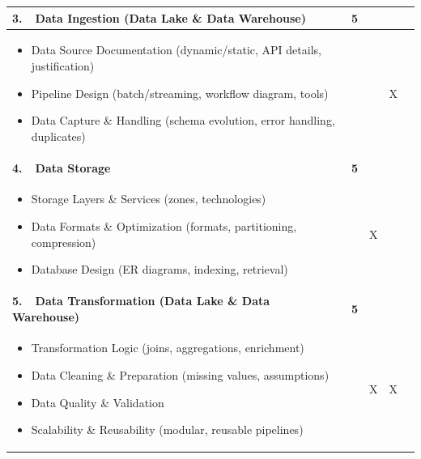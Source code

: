 \begin{table}[htbp]
\begin{tabular}{|L|P|C|C|C|}
\textbf{3.\ \ Data Ingestion (Data Lake \& Data Warehouse)} & \textbf{5} &  &  &  \\
\hline
\begin{minipage}[t]{\linewidth}\vspace{2pt}
\begin{itemize}[leftmargin=1.2em, nosep]
  \item Data Source Documentation (dynamic/static, API details, justification)
  \item Pipeline Design (batch/streaming, workflow diagram, tools)
  \item Data Capture \& Handling (schema evolution, error handling, duplicates)
\end{itemize}\vspace{2pt}
\end{minipage}
&  &  & X &  \\
\hline

\textbf{4.\ \ Data Storage} & \textbf{5} &  &  &  \\
\hline
\begin{minipage}[t]{\linewidth}\vspace{2pt}
\begin{itemize}[leftmargin=1.2em, nosep]
  \item Storage Layers \& Services (zones, technologies)
  \item Data Formats \& Optimization (formats, partitioning, compression)
  \item Database Design (ER diagrams, indexing, retrieval)
\end{itemize}\vspace{2pt}
\end{minipage}
&  & X &  &  \\
\hline

\textbf{5.\ \ Data Transformation (Data Lake \& Data Warehouse)} & \textbf{5} &  &  &  \\
\hline
\begin{minipage}[t]{\linewidth}\vspace{2pt}
\begin{itemize}[leftmargin=1.2em, nosep]
  \item Transformation Logic (joins, aggregations, enrichment)
  \item Data Cleaning \& Preparation (missing values, assumptions)
  \item Data Quality \& Validation
  \item Scalability \& Reusability (modular, reusable pipelines)
\end{itemize}\vspace{2pt}
\end{minipage}
&  & X & X &  \\
\hline


\end{tabular}
\end{table}
